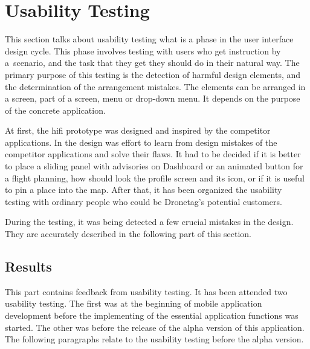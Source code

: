 \section{Usability Testing}\label{sec:usability-testing}

This section talks about usability testing what is a phase in the user interface design cycle.
This phase involves testing with users who get instruction by a~scenario, and the task that they get they should do in their natural way.
The primary purpose of this testing is the detection of harmful design elements, and the determination of the arrangement mistakes.
The elements can be arranged in a screen, part of a screen, menu or drop-down menu.
It depends on the purpose of the concrete application.

At first, the \acrshort{hifi} prototype was designed and inspired by the competitor applications.
In the design was effort to learn from design mistakes of the competitor applications and solve their flaws.
It had to be decided if it is better to place a sliding panel with advisories on Dashboard or an animated button for a flight planning, how should look the profile screen and its icon, or if it is useful to pin a place into the map.
After that, it has been organized the usability testing with ordinary people who could be Dronetag's potential customers.

During the testing, it was being detected a few crucial mistakes in the design.
They are accurately described in the following part of this section.

\subsection{Results}\label{subsec:results}
This part contains feedback from usability testing.
It has been attended two usability testing.
The first was at the beginning of mobile application development before the implementing of the essential application functions was started.
The other was before the release of the alpha version of this application.
The following paragraphs relate to the usability testing before the alpha version.

